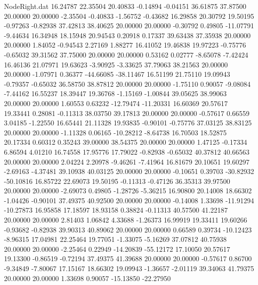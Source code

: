 \begin{filecontents}{NodeRight.dat}
  16.24787   22.35504   20.40833    -0.14894   -0.04151   36.61875   37.87500   20.00000   20.00000   -2.35504   -0.40833   -1.56752   -0.43682
  16.29858   20.30792   19.50195    -0.97263   -0.82938   37.42813   38.40625   20.00000   20.00000   -0.30792    0.49805  -11.07791   -9.44634
  16.34948   18.15948   20.94543     0.20918    0.17337   39.63438   37.35938   20.00000   20.00000    1.84052   -0.94543    2.27169    1.88277
  16.41052   19.46838   19.97223    -0.75776   -0.65032   39.31562   37.75000   20.00000   20.00000    0.53162    0.02777   -8.65078   -7.42424
  16.46136   21.07971   19.63623    -3.90925   -3.33625   37.79063   38.21563   20.00000   20.00000   -1.07971    0.36377  -44.66085  -38.11467
  16.51199   21.75110   19.09943    -0.79357   -0.65032   36.58750   38.87812   20.00000   20.00000   -1.75110    0.90057   -9.08084   -7.44162
  16.55237   18.39447   19.36768    -1.15169   -1.00844   39.05625   38.99063   20.00000   20.00000    1.60553    0.63232  -12.79474  -11.20331
  16.60369   20.57617   19.33441     0.28081   -0.11313   38.03750   39.17813   20.00000   20.00000   -0.57617    0.66559    3.04185   -1.22550
  16.65441   21.11328   19.93835    -0.90101   -0.75776   37.03125   38.83125   20.00000   20.00000   -1.11328    0.06165  -10.28212   -8.64738
  16.70503   18.52875   20.17334     0.60312    0.35243   39.00000   38.54375   20.00000   20.00000    1.47125   -0.17334    6.86594    4.01210
  16.74558   17.95776   17.79022    -0.82938   -0.65032   40.37812   40.66563   20.00000   20.00000    2.04224    2.20978   -9.46261   -7.41964
  16.81679   20.10651   19.60297    -2.69163   -4.37481   39.10938   40.03125   20.00000   20.00000   -0.10651    0.39703  -30.82932  -50.10816
  16.85722   22.69073   19.50195    -0.11313   -0.47126   36.35313   39.97500   20.00000   20.00000   -2.69073    0.49805   -1.28726   -5.36215
  16.90800   20.14008   18.66302    -1.04426   -0.90101   37.49375   40.92500   20.00000   20.00000   -0.14008    1.33698  -11.91294  -10.27873
  16.95858   17.18597   18.93158     0.38824   -0.11313   40.57500   41.22187   20.00000   20.00000    2.81403    1.06842    4.33688   -1.26373
  16.99919   19.33411   19.60266    -0.93682   -0.82938   39.90313   40.89062   20.00000   20.00000    0.66589    0.39734  -10.12423   -8.96315
  17.04981   22.25464   19.77051    -1.33075   -5.16269   37.07812   40.75938   20.00000   20.00000   -2.25464    0.22949  -14.20839  -55.12172
  17.10050   20.57617   19.13300    -0.86519   -0.72194   37.49375   41.39688   20.00000   20.00000   -0.57617    0.86700   -9.34849   -7.80067
  17.15167   18.66302   19.09943    -1.36657   -2.01119   39.34063   41.79375   20.00000   20.00000    1.33698    0.90057  -15.13850  -22.27950

\end{filecontents}
